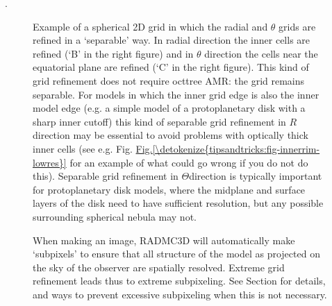 \documentclass[letterpaper,10pt,english]{sphinxmanual}
\begin{document}
 {\hyperref[\detokenize{gridding:sec-oct-tree-amr}]{}}.

\begin{figure}[htbp]
\centering
\capstart

\noindent{}
\caption{Example of a spherical 2\sphinxhyphen{}D grid in which the radial and \(\theta\) grids
are refined in a ‘separable’ way. In radial direction the inner cells are
refined (‘B’ in the right figure) and in \(\theta\) direction the cells
near the equatorial plane are refined (‘C’ in the right figure). This kind of
grid refinement does not require oct\sphinxhyphen{}tree AMR: the grid remains
separable. For models in which the inner grid edge is also the inner model
edge (e.g. a simple model of a protoplanetary disk with a sharp inner
cut\sphinxhyphen{}off) this kind of separable grid refinement in \(R\)\sphinxhyphen{}direction may be
essential to avoid problems with optically thick inner cells (see e.g. Fig.
\hyperref[\detokenize{tipsandtricks:fig-innerrim-lowres}]{Fig.\@ \ref{\detokenize{tipsandtricks:fig-innerrim-lowres}}} for an example of what could go wrong if you do
not do this). Separable grid refinement in \(\Theta\)\sphinxhyphen{}direction is
typically important for protoplanetary disk models, where the midplane and
surface layers of the disk need to have sufficient resolution, but any
possible surrounding spherical nebula may not.}\label{\detokenize{gridding:id2}}\label{\detokenize{gridding:fig-spher-sep-ref-txt}}\end{figure}

\begin{figure}[htbp]
\centering
\capstart

\noindent{}
\caption{When making an image, RADMC\sphinxhyphen{}3D will automatically make ‘sub\sphinxhyphen{}pixels’ to ensure
that all structure of the model as projected on the sky of the observer are
spatially resolved.  Extreme grid refinement leads thus to extreme
sub\sphinxhyphen{}pixeling. See Section {\hyperref[\detokenize{imagesspectra:sec-rec-subpixel-spher-coord}]{}} for details,
and ways to prevent excessive sub\sphinxhyphen{}pixeling when this is not necessary.}\label{\detokenize{gridding:id3}}\label{\detokenize{gridding:fig-spher-sep-ref-rays}}\end{figure}
\end{document}

